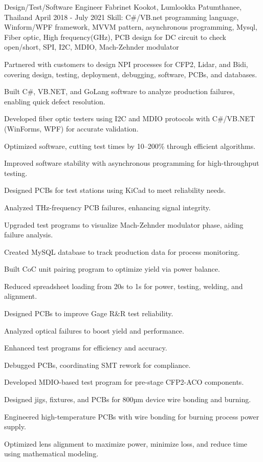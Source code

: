 \begin{cventries}
  \cventry
    {Design/Test/Software Engineer} %
    {Fabrinet} %
    {Kookot, Lumlookka Patumthanee, Thailand} %
    {April 2018 - July 2021} %
    {Skill: C\#/VB.net programming language, Winform/WPF framework, MVVM
    pattern, asynchronous programming, Mysql, Fiber optic, High frequency(GHz), PCB
    design for DC circuit to check open/short, SPI, I2C, MDIO, Mach-Zehnder modulator} %
    {
      \begin{cvitems} %
        \item {Partnered with customers to design NPI processes for CFP2, Lidar, and Bidi, covering design, testing, deployment, debugging, software, PCBs, and databases.}
        \item {Built C\#, VB.NET, and GoLang software to analyze production failures, enabling quick defect resolution.}
        \item {Developed fiber optic testers using I2C and MDIO protocols with C\#/VB.NET (WinForms, WPF) for accurate validation.}
        \item {Optimized software, cutting test times by 10–200\% through efficient algorithms.}
        \item {Improved software stability with asynchronous programming for high-throughput testing.}
        \item {Designed PCBs for test stations using KiCad to meet reliability needs.}
        \item {Analyzed THz-frequency PCB failures, enhancing signal integrity.}
        \item {Upgraded test programs to visualize Mach-Zehnder modulator phase, aiding failure analysis.}
        \item {Created MySQL database to track production data for process monitoring.}
        \item {Built CoC unit pairing program to optimize yield via power balance.}
        \item {Reduced spreadsheet loading from 20s to 1s for power, testing, welding, and alignment.}
        \item {Designed PCBs to improve Gage R\&R test reliability.}
        \item {Analyzed optical failures to boost yield and performance.}
        \item {Enhanced test programs for efficiency and accuracy.}
        \item {Debugged PCBs, coordinating SMT rework for compliance.}
        \item {Developed MDIO-based test program for pre-stage CFP2-ACO components.}
        \item {Designed jigs, fixtures, and PCBs for 800µm device wire bonding and burning.}
        \item {Engineered high-temperature PCBs with wire bonding for burning process power supply.}
        \item {Optimized lens alignment to maximize power, minimize loss, and reduce time using mathematical modeling.}
      \end{cvitems}
    }


\end{cventries}

